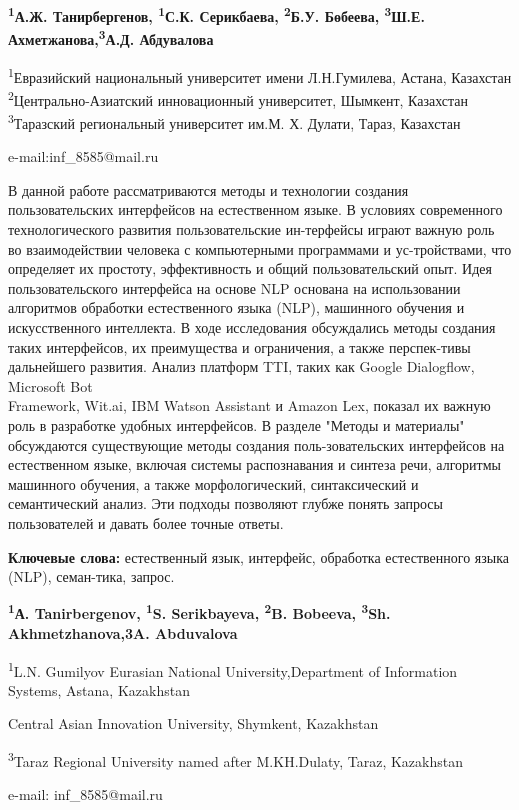 \begin{center}

{\bfseries \textsuperscript{1}А.Ж. Танирбергенов, \textsuperscript{1}С.К.
Серикбаева\envelope, \textsuperscript{2}Б.У. Бөбеева,
\textsuperscript{3}Ш.Е. Ахметжанова,\textsuperscript{3}А.Д. Абдувалова}

\textsuperscript{1}Евразийский национальный университет имени
Л.Н.Гумилева, Астана, Казахстан \textsuperscript{2}Центрально-Азиатский
инновационный университет, Шымкент, Казахстан \\ \textsuperscript{3}Таразский региональный университет им.М. Х. Дулати,
Тараз, Казахстан

e-mail:inf\_8585@mail.ru
\end{center}

В данной работе рассматриваются методы и технологии создания
пользовательских интерфейсов на естественном языке. В условиях
современного технологического развития пользовательские ин-терфейсы
играют важную роль во взаимодействии человека с компьютерными
программами и ус-тройствами, что определяет их простоту, эффективность и
общий пользовательский опыт. Идея пользовательского интерфейса на основе
NLP основана на использовании алгоритмов обработки естественного языка
(NLP), машинного обучения и искусственного интеллекта. В ходе
исследования обсуждались методы создания таких интерфейсов, их
преимущества и ограничения, а также перспек-тивы дальнейшего развития.
Анализ платформ TTI, таких как Google Dialogflow, Microsoft Bot
\\Framework, Wit.ai, IBM Watson Assistant и Amazon Lex, показал их важную
роль в разработке удобных интерфейсов. В разделе "Методы и материалы"
обсуждаются существующие методы создания поль-зовательских интерфейсов на
естественном языке, включая системы распознавания и синтеза речи,
алгоритмы машинного обучения, а также морфологический, синтаксический и
семантический анализ. Эти подходы позволяют глубже понять запросы
пользователей и давать более точные ответы.

{\bfseries Ключевые слова:} естественный язык, интерфейс, обработка
естественного языка (NLP), семан-тика, запрос.

\begin{center}
{\bfseries \textsuperscript{1}А. Tanirbergenov, \textsuperscript{1}S.
Serikbayeva\envelope, \textsuperscript{2}B. Bobeeva,
\textsuperscript{3}Sh. Akhmetzhanova,{3}A. Abduvalova}

\textsuperscript{1}L.N. Gumilyov Eurasian National University,Department
of Information Systems, Astana, Kazakhstan

Central Asian Innovation University, Shymkent, Kazakhstan

\textsuperscript{3}Taraz Regional University named after M.KH.Dulaty,
Taraz, Kazakhstan

e-mail: inf\_8585@mail.ru
\end{center}

